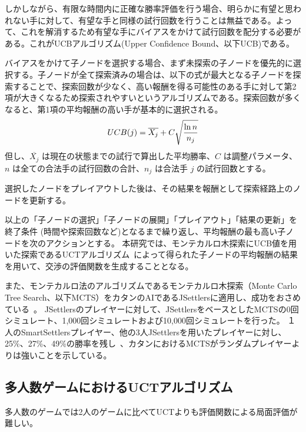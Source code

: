 \documentclass[a4, 10pt,dvipdfmx]{jsarticle}
\begin{document}
しかしながら、有限な時間内に正確な勝率評価を行う場合、明らかに有望と思われない手に対して、有望な手と同様の試行回数を行うことは無益である。よって、これを解消するため有望な手にバイアスをかけて試行回数を配分する必要がある。これがUCBアルゴリズム(Upper Confidence Bound、以下UCB)である。 


バイアスをかけて子ノードを選択する場合、まず未探索の子ノードを優先的に選択する。子ノードが全て探索済みの場合は、以下の式が最大となる子ノードを探索することで、探索回数が少なく、高い報酬を得る可能性のある手に対して第2項が大きくなるため探索されやすいというアルゴリズムである。探索回数が多くなると、第1項の平均報酬の高い手が基本的に選択される。
\begin{equation}
  UCB(j)=\overline{X_j} + C\sqrt{\mathstrut \frac{\ln{n}}{n_j}}
\end{equation}
但し、$\overline{X_j}$ は現在の状態までの試行で算出した平均勝率、$C$ は調整パラメータ、$n$ は全ての合法手の試行回数の合計、$n_j$ は合法手 $j$ の試行回数とする。

選択したノードをプレイアウトした後は、その結果を報酬として探索経路上のノードを更新する。

以上の「子ノードの選択」「子ノードの展開」「プレイアウト」「結果の更新」を終了条件 (時間や探索回数など)となるまで繰り返し、平均報酬の最も高い子ノードを次のアクションとする。
本研究では、モンテカルロ木探索にUCB値を用いた探索であるUCTアルゴリズム~\cite{kocsis2006bandit,auer2002finite}によって得られた子ノードの平均報酬の結果を用いて、交渉の評価関数を生成することとなる。

また、モンテカルロ法のアルゴリズムであるモンテカルロ木探索（Monte Carlo Tree Search、以下MCTS）をカタンのAIであるJSettlersに適用し、成功をおさめている~\cite{branca2007using}。
JSettlersのプレイヤーに対して、JSettlersをベースとしたMCTSの0回シミュレート、1,000回シミュレートおよび10,000回シミュレートを行った。
１人のSmartSettlersプレイヤー、他の3人JSettlersを用いたプレイヤーに対し、25\%、27\%、49\%の勝率を残し~\cite{szita2010monte}、カタンにおけるMCTSがランダムプレイヤーよりは強いことを示している。

\subsection{多人数ゲームにおけるUCTアルゴリズム}

多人数のゲームでは2人のゲームに比べてUCTよりも評価関数による局面評価が難しい。~\cite{sturtevant2008analysis}
\end{document}
